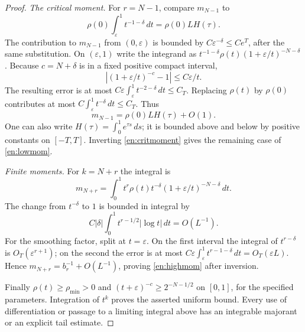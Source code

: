 \documentclass[12pt]{amsart}
\theoremstyle{definition}
\theoremstyle{remark}
\numberwithin{equation}{section}
\theoremstyle{definition}
\begin{document}
\begin{proof}
\emph{The critical moment.}
For $r=N-1$, compare $m_{N-1}$ to
\begin{equation}\label{en:criticalintegral}
 \rho(0)\int_\varepsilon^1t^{-1-\delta}\,dt
 =\rho(0)LH(\tau).
\end{equation}
The contribution to $m_{N-1}$ from $(0,\varepsilon)$ is bounded by
$C\varepsilon^{-\delta}\le Ce^T$, after the same substitution.
On $(\varepsilon,1)$ write the integrand as
$t^{-1-\delta}\rho(t)(1+\varepsilon/t)^{-N-\delta}$.
Because $c=N+\delta$ is in a fixed positive compact interval,
\[
 |(1+\varepsilon/t)^{-c}-1|\le C\varepsilon/t.
\]
The resulting error is at most
$C\varepsilon\int_\varepsilon^1t^{-2-\delta}\,dt\le C_T$.
Replacing $\rho(t)$ by $\rho(0)$ contributes at most
$C\int_\varepsilon^1t^{-\delta}\,dt\le C_T$.
Thus
\begin{equation}\label{en:critmoment}
 m_{N-1}=\rho(0)LH(\tau)+O(1).
\end{equation}
One can also write $H(\tau)=\int_0^1e^{\tau s}\,ds$; it is bounded
above and below by positive constants on $[-T,T]$. Inverting
\eqref{en:critmoment} gives the remaining case of \eqref{en:lowmom}.

\emph{Finite moments.}
For $k=N+r$ the integral is
\[
 m_{N+r}=\int_0^1t^r\rho(t)t^{-\delta}
 (1+\varepsilon/t)^{-N-\delta}\,dt.
\]
The change from $t^{-\delta}$ to $1$ is bounded in integral by
\[
 C|\delta|\int_0^1t^{r-1/2}|\log t|\,dt=O(L^{-1}).
\]
For the smoothing factor, split at $t=\varepsilon$. On the first
interval the integral of $t^{r-\delta}$ is $O_T(\varepsilon^{r+1})$;
on the second the error is at most
$C\varepsilon\int_\varepsilon^1t^{r-1-\delta}\,dt
=O_T(\varepsilon L)$. Hence
$m_{N+r}=b_r^{-1}+O(L^{-1})$, proving \eqref{en:highmom} after inversion.

Finally $\rho(t)\ge\rho_{\min}>0$ and
$(t+\varepsilon)^{-c}\ge2^{-N-1/2}$ on $[0,1]$, for the specified
parameters. Integration of $t^k$ proves the asserted uniform bound.
Every use of differentiation or passage to a limiting integral above
has an integrable majorant or an explicit tail estimate.
\end{proof}
\end{document}
